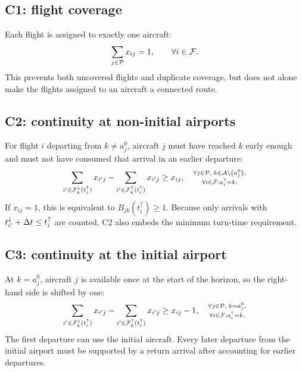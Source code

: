 \subsection{C1: flight coverage}

Each flight is assigned to exactly one aircraft:
\begin{equation}
    \sum_{j\in\mathcal{P}}x_{ij}=1,
    \qquad\forall i\in\mathcal{F}.
    \label{eq:ground_c1}
\end{equation}
This prevents both uncovered flights and duplicate coverage, but does not alone
make the flights assigned to an aircraft a connected route.

\subsection{C2: continuity at non-initial airports}

For flight $i$ departing from $k\neq a_j^0$, aircraft $j$ must have reached
$k$ early enough and must not have consumed that arrival in an earlier
departure:
\begin{equation}
    \sum_{i'\in\mathcal{F}_k^{\downarrow}(t_i^{\uparrow})}x_{i'j}
    -\sum_{i'\in\mathcal{F}_k^{\uparrow}(t_i^{\uparrow})}x_{i'j}
    \geq x_{ij},
    \quad
    \substack{\forall j\in\mathcal{P},\;k\in\mathcal{A}\setminus\{a_j^0\},\\
    \forall i\in\mathcal{F}:a_i^{\uparrow}=k.}
    \label{eq:ground_c2}
\end{equation}
If $x_{ij}=1$, this is equivalent to
$B_{jk}(t_i^{\uparrow})\geq1$. Because only arrivals with
$t_{i'}^{\downarrow}+\Delta t\leq t_i^{\uparrow}$ are counted, C2 also embeds the
minimum turn-time requirement.

\subsection{C3: continuity at the initial airport}

At $k=a_j^0$, aircraft $j$ is available once at the start of the horizon, so
the right-hand side is shifted by one:
\begin{equation}
    \sum_{i'\in\mathcal{F}_k^{\downarrow}(t_i^{\uparrow})}x_{i'j}
    -\sum_{i'\in\mathcal{F}_k^{\uparrow}(t_i^{\uparrow})}x_{i'j}
    \geq x_{ij}-1,
    \quad
    \substack{\forall j\in\mathcal{P},\;k=a_j^0,\\
    \forall i\in\mathcal{F}:a_i^{\uparrow}=k.}
    \label{eq:ground_c3}
\end{equation}
The first departure can use the initial aircraft. Every later departure from
the initial airport must be supported by a return arrival after accounting for
earlier departures.

